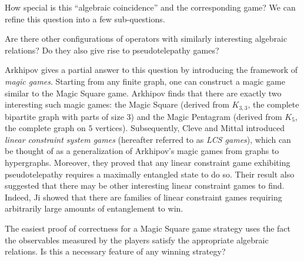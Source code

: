 How special is this ``algebraic coincidence'' and the corresponding game? We can refine this question into a few sub-questions.
\begin{question}\label{question:is-magic-square-setup-unique?}
	Are there other configurations of operators with similarly interesting algebraic relations? Do they also give rise to pseudotelepathy games?
\end{question}

Arkhipov \cite{arkhipov2012extending} gives a partial answer to this question by introducing the framework of \emph{magic games}. Starting from any finite graph, one can construct a magic game similar to the Magic Square game. Arkhipov finds that there are exactly two interesting such magic games: the Magic Square (derived from $K_{3,3}$, the complete bipartite graph with parts of size $3$) and the Magic Pentagram (derived from $K_5$, the complete graph on $5$ vertices). 
Subsequently, Cleve and Mittal \cite{cleve2014characterization} introduced \emph{linear constraint system games} (hereafter referred to as \emph{LCS games}), which can be thought of as a generalization of Arkhipov's magic games from graphs to hypergraphs. Moreover, they proved that any linear constraint game exhibiting pseudotelepathy requires a maximally entangled state to do so. Their result also suggested that there may be other interesting linear constraint games to find. Indeed, Ji showed \cite{ji2013binary} that there are families of linear constraint games requiring arbitrarily large amounts of entanglement to win. 


\begin{question}\label{question:is-magic-square-solution-unique?}
	The easiest proof of correctness for a Magic Square game strategy uses the fact the observables measured by the players satisfy the appropriate algebraic relations. Is this a necessary feature of any winning strategy?
\end{question}

